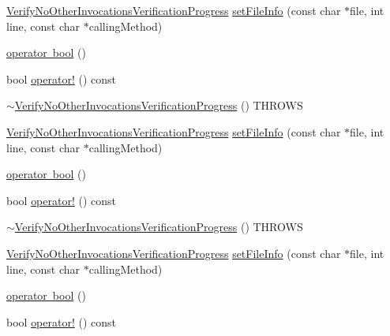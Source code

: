\begin{DoxyCompactItemize}
\mbox{\hyperlink{classfakeit_1_1VerifyNoOtherInvocationsVerificationProgress}{Verify\+No\+Other\+Invocations\+Verification\+Progress}} \mbox{\hyperlink{classfakeit_1_1VerifyNoOtherInvocationsVerificationProgress_a7f7eed982a12383ca4254831cf4d223b}{set\+File\+Info}} (const char $\ast$file, int line, const char $\ast$calling\+Method)
\item 
\mbox{\hyperlink{classfakeit_1_1VerifyNoOtherInvocationsVerificationProgress_a0c43a3d8783d9dae9d963190a6a41b47}{operator bool}} ()
\item 
bool \mbox{\hyperlink{classfakeit_1_1VerifyNoOtherInvocationsVerificationProgress_a61e25bc85da74b9eceae47fcca1dec4f}{operator!}} () const
\item 
\mbox{\hyperlink{classfakeit_1_1VerifyNoOtherInvocationsVerificationProgress_a772030e95159eefd02781fb3ea7724cd}{$\sim$\+Verify\+No\+Other\+Invocations\+Verification\+Progress}} () T\+H\+R\+O\+WS
\item 
\mbox{\hyperlink{classfakeit_1_1VerifyNoOtherInvocationsVerificationProgress}{Verify\+No\+Other\+Invocations\+Verification\+Progress}} \mbox{\hyperlink{classfakeit_1_1VerifyNoOtherInvocationsVerificationProgress_a7f7eed982a12383ca4254831cf4d223b}{set\+File\+Info}} (const char $\ast$file, int line, const char $\ast$calling\+Method)
\item 
\mbox{\hyperlink{classfakeit_1_1VerifyNoOtherInvocationsVerificationProgress_a0c43a3d8783d9dae9d963190a6a41b47}{operator bool}} ()
\item 
bool \mbox{\hyperlink{classfakeit_1_1VerifyNoOtherInvocationsVerificationProgress_a61e25bc85da74b9eceae47fcca1dec4f}{operator!}} () const
\item 
\mbox{\hyperlink{classfakeit_1_1VerifyNoOtherInvocationsVerificationProgress_a772030e95159eefd02781fb3ea7724cd}{$\sim$\+Verify\+No\+Other\+Invocations\+Verification\+Progress}} () T\+H\+R\+O\+WS
\item 
\mbox{\hyperlink{classfakeit_1_1VerifyNoOtherInvocationsVerificationProgress}{Verify\+No\+Other\+Invocations\+Verification\+Progress}} \mbox{\hyperlink{classfakeit_1_1VerifyNoOtherInvocationsVerificationProgress_a7f7eed982a12383ca4254831cf4d223b}{set\+File\+Info}} (const char $\ast$file, int line, const char $\ast$calling\+Method)
\item 
\mbox{\hyperlink{classfakeit_1_1VerifyNoOtherInvocationsVerificationProgress_a0c43a3d8783d9dae9d963190a6a41b47}{operator bool}} ()
\item 
bool \mbox{\hyperlink{classfakeit_1_1VerifyNoOtherInvocationsVerificationProgress_a61e25bc85da74b9eceae47fcca1dec4f}{operator!}} () const

\end{DoxyCompactItemize}
